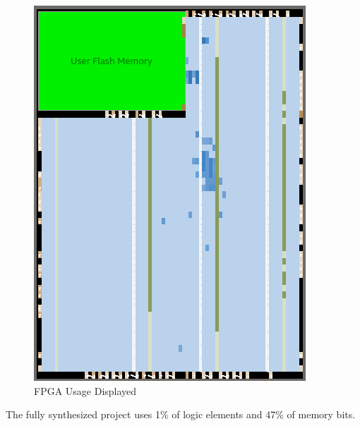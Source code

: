 \documentclass[a4paper]{article}
\begin{document}
\vspace{.25 in}
\begin{figure}[h]
  \centering
    \includegraphics[width=4 in]{Images/project_usage.png}
	\caption{FPGA Usage Displayed}
    \label{fig:keyboard_driver_sim}
\end{figure}
The fully synthesized project uses 1\% of logic elements and 47\% of memory bits.


\newpage
\end{document}
